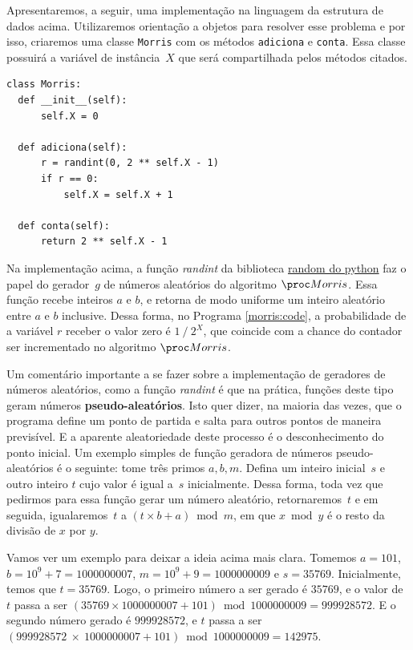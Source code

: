 Apresentaremos, a seguir, uma implementação na linguagem  da estrutura de dados acima. Utilizaremos 
orientação a objetos para resolver esse problema e por isso, criaremos uma classe \texttt{Morris} com os métodos 
\texttt{adiciona} e \texttt{conta}. Essa classe possuirá a variável de instância~$X$ que será compartilhada pelos 
métodos citados.

\begin{lstlisting}[style=mypython,caption=Implementação do algoritmo $\Morris$,captionpos=b, label=morris:code]
class Morris:
  def __init__(self):
      self.X = 0

  def adiciona(self):
      r = randint(0, 2 ** self.X - 1)
      if r == 0:
          self.X = self.X + 1

  def conta(self):
      return 2 ** self.X - 1
\end{lstlisting}

Na implementação acima, a função \textit{randint} da biblioteca \hyperref[PythonRandom]{random do python} faz o papel do 
gerador~$g$ de números aleatórios do algoritmo $\Morris$. Essa função recebe inteiros $a$ e $b$, e retorna de modo 
uniforme um inteiro aleatório entre $a$ e $b$ inclusive. Dessa forma, no Programa \ref{morris:code}, a probabilidade de 
a variável $r$ receber o valor zero é $1 \mathbin{/} 2^{X}$, que coincide com a chance do contador ser incrementado no 
algoritmo $\Morris$.

Um comentário importante a se fazer sobre a implementação de geradores de números aleatórios, como a função 
\textit{randint} é que na prática, funções deste tipo geram números \textbf{pseudo-aleatórios}. Isto quer dizer, na 
maioria das vezes, que o programa define um ponto de partida e salta para outros pontos de maneira previsível. E a 
aparente aleatoriedade deste processo é o desconhecimento do ponto inicial. Um exemplo simples de função geradora de 
números pseudo-aleatórios é o seguinte: tome três primos $a, b, m$. Defina um inteiro inicial~$s$ e outro inteiro $t$ 
cujo valor é igual a~$s$ inicialmente. Dessa forma, toda vez que pedirmos para essa função gerar um número aleatório, 
retornaremos~$t$ e em seguida, igualaremos~$t$ a $(t \times b + a) \bmod m$, em que $x \bmod y$ é o resto da divisão de 
$x$ por $y$.

Vamos ver um exemplo para deixar a ideia acima mais clara. Tomemos $a = 101$, $b = 10^9 + 7 = 1000000007$, 
$m = 10^9 + 9 = 1000000009$ e $s = 35769$. Inicialmente, temos que $t = 35769$. Logo, o primeiro número a ser gerado é
$35769$, e o valor de $t$ passa a ser $(35769 \times 1000000007 + 101) \bmod 1000000009 = 999928572$. E o segundo número
gerado é $999928572$, e $t$ passa a ser $(999928572 \ \times \ 1000000007 + 101) \bmod 1000000009 = 142975$.

